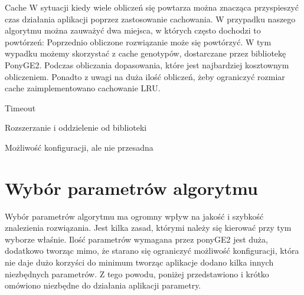 Cache
W sytuacji kiedy wiele obliczeń się powtarza można znacząca przyspieszyć czas działania aplikacji poprzez zastosowanie cachowania. W przypadku naszego algorytmu można zauważyć dwa miejsca, w których często dochodzi to powtórzeń:
Poprzednio obliczone rozwiązanie może się powtórzyć. W tym wypadku możemy skorzystać z cache genotypów, dostarczane przez bibliotekę PonyGE2.
Podczas obliczania dopasowania, które jest najbardziej kosztownym obliczeniem. Ponadto z uwagi na duża ilość obliczeń, żeby ograniczyć rozmiar cache zaimplementowano cachowanie LRU.

Timeout

Rozszerzanie i oddzielenie od biblioteki

Możliwość konfiguracji, ale nie przesadna

\section{Wybór parametrów algorytmu}
Wybór parametrów algorytmu ma ogromny wpływ na jakość i szybkość znalezienia rozwiązania. Jest kilka zasad, którymi należy się kierować przy tym wyborze właśnie. Ilość parametrów wymagana przez ponyGE2 jest duża, dodatkowo tworząc mimo, że starano się ograniczyć możliwość konfiguracji, która nie daje dużo korzyści do minimum tworząc aplikacje dodano kilka innych niezbędnych parametrów. Z tego powodu, poniżej przedstawiono i krótko omówiono niezbędne do działania aplikacji parametry.

